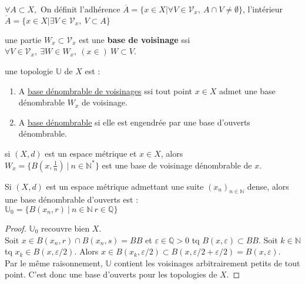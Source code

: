 \begin{definition}
$\forall A\subset X,$ On définit l'adhérence $\overline{A}=\{x\in X|\forall V\in \mathcal{V}_x,\ A\cap V\neq \emptyset  \}$, l'intérieur $\mathring{A}=\{x\in X|\exists V\in \mathcal{V}_x,\ V\subset A\}$
\end{definition}
\begin{definition}
    une partie $W_x\subset \mathcal{V}_x$ est une \textbf{base de voisinage} ssi \\$\forall V\in \mathcal{V}_x, \ \exists W\in W_x,\ (x \in )~W\subset V$.
\end{definition}
\begin{definition}
     une topologie $\mathbb{U}$ de $X$ est :
\begin{enumerate}
    \item A \underline{base dénombrable de voisinages} ssi tout point $x\in X$ admet une base dénombrable $W_x$ de voisinage.
    \item A \underline{base dénombrable} si elle est engendrée par une base d'ouverts dénombrable.
\end{enumerate}
\end{definition}
\begin{remarque}
    si $(X,d)$ est un espace métrique et $x\in X$, alors \\
    $W_x=\{B(x,\frac{1}{n})\ |\ n\in \mathbb{N} ^*\}$ est une base de voisinage dénombrable de $x$.
\end{remarque}
\begin{remarque}
    Si $(X,d)$ est un espace métrique admettant une suite $(x_n)_{n\in \mathbb{N} }$ dense, alors une base dénombrable d'ouverts est :\\
    $\mathbb{U}_0=\{B(x_{n}, r)\ |\ n\in \mathbb{N} \ r\in \mathbb{Q} \}$
\end{remarque}
\begin{proof}
    $\mathbb{U}_0$ recouvre bien $X$. \\
    Soit $x\in B(x_{n}, r)\cap B(x_{n}, s)=BB$ et $\varepsilon\in \mathbb{Q} >0 $ tq $B(x,\varepsilon )\subset BB$. Soit $k\in \mathbb{N} $ tq $x_k\in B(x,\varepsilon /2)$. Alors $x\in B(x_k, \varepsilon /2)\subset B(x,\varepsilon /2 + \varepsilon /2)=B(x,\varepsilon)$. \\

\noindent Par le même raisonnement, $\mathbb{U}$ contient les voisinages arbitrairement petits de tout point. C'est donc une base d'ouverts pour les topologies de $X$.
\end{proof}
